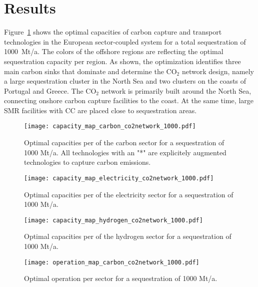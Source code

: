 \documentclass[conference]{IEEEtran}
\begin{document}
\section{Results}
\label{sec:results}

Figure~\ref{fig:capacity_map_carbon_co2network_1000} shows the optimal capacities of carbon capture and transport technologies in the European sector-coupled system for a total sequestration of 1000~Mt/a. The colors of the offshore regions are reflecting the optimal sequestration capacity per region. As shown, the optimization identifies three main carbon sinks that dominate and determine the CO$_2$ network design, namely a large sequestration cluster in the North Sea and two clusters on the coasts of Portugal and Greece. The CO$_2$ network is primarily built around the North Sea, connecting onshore carbon capture facilities to the coast. At the same time, large SMR facilities with CC are placed close to sequestration areas.


\begin{figure}[h]
    \centering
    \texttt{[image: capacity\_map\_carbon\_co2network\_1000.pdf]}
    \caption{Optimal capacities per of the carbon sector for a sequestration of 1000 Mt/a. All technologies with an "*" are explicitely augmented technologies to capture carbon emissions.}
    \label{fig:capacity_map_carbon_co2network_1000}
\end{figure}



\begin{figure}[h]
    \centering
    \texttt{[image: capacity\_map\_electricity\_co2network\_1000.pdf]}
    \caption{Optimal capacities per of the electricity sector for a sequestration of 1000 Mt/a.}
    \label{fig:capacity_map_electricity_co2network_1000}
\end{figure}


\begin{figure}[h]
    \centering
    \texttt{[image: capacity\_map\_hydrogen\_co2network\_1000.pdf]}
    \caption{Optimal capacities per of the hydrogen sector for a sequestration of 1000 Mt/a.}
    \label{fig:capacity_map_hydrogen_co2network_1000}
\end{figure}



\begin{figure*}
    \centering
    \texttt{[image: operation\_map\_carbon\_co2network\_1000.pdf]}
    \caption{Optimal operation per sector for a sequestration of 1000 Mt/a.}
    \label{fig:operation_map_noco2network_1000}
\end{figure*}
\end{document}
